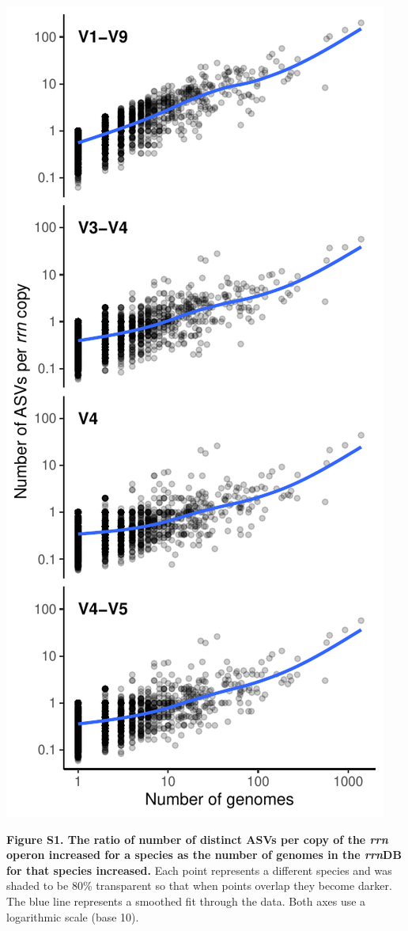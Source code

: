 \documentclass[
]{article}
\begin{document}
\includegraphics{../figures/esv_rate.pdf}

\textbf{Figure S1. The ratio of number of distinct ASVs per copy of the
\emph{rrn} operon increased for a species as the number of genomes in
the \emph{rrn}DB for that species increased.} Each point represents a
different species and was shaded to be 80\% transparent so that when
points overlap they become darker. The blue line represents a smoothed
fit through the data. Both axes use a logarithmic scale (base 10).
\end{document}
